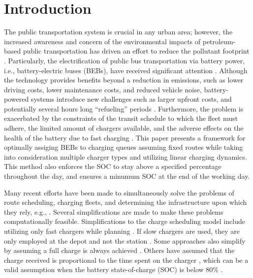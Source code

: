 \documentclass[ee,thesis]{usuthesis}
\begin{document}
\section{Introduction}
\label{sec:milp-introduction}
The public transportation system is crucial in any urban area; however, the increased awareness and concern of the
environmental impacts of petroleum-based public transportation has driven an effort to reduce the pollutant footprint
\cite{de-2014-simul-elect,xylia-2018-role-charg,guida-2017-zeeus-repor-europ,li-2016-batter-elect}. Particularly,
the electrification of public bus transportation via battery power, i.e., battery-electric buses (BEBs), have received
significant attention \cite{li-2016-batter-elect}. Although the technology provides benefits beyond a reduction in
emissions, such as lower driving costs, lower maintenance costs, and reduced vehicle noise, battery-powered systems
introduce new challenges such as larger upfront costs, and potentially several hours long ``refueling'' periods
\cite{xylia-2018-role-charg,li-2016-batter-elect}. Furthermore, the problem is exacerbated by the constraints of the
transit schedule to which the fleet must adhere, the limited amount of chargers available, and the adverse effects on
the health of the battery due to fast charging \cite{lutsey-2019-updat-elect}. This paper presents a
framework for optimally assiging BEBs to charging queues assuming fixed routes while taking into consideration multiple
charger types and utilizing linear charging dynamics. This method also enforces the SOC to stay above a specified
percentage throughout the day, and ensures a minumum SOC at the end of the working day.

Many recent efforts have been made to simultaneously solve the problems of route scheduling, charging fleets, and
determining the infrastructure upon which they rely, e.g., \cite{wei-2018-optim-spatio,sebastiani-2016-evaluat-elect,hoke-2014-accoun-lithium,wang-2017-elect-vehic}. Several simplifications are made to make these problems
computationally feasible. Simplifications to the charge scheduling model include utilizing only fast chargers while
planning \cite{wei-2018-optim-spatio,sebastiani-2016-evaluat-elect,wang-2017-optim-rechar,zhou-2020-bi-objec,yang-2018-charg-sched,wang-2017-elect-vehic,qin-2016-numer-analy,liu-2020-batter-elect}. If slow chargers are used,
they are only employed at the depot and not the station \cite{he-2020-optim-charg,tang-2019-robus-sched}. Some
approaches also simplify by assuming a full charge is always achieved
\cite{wei-2018-optim-spatio,wang-2017-elect-vehic,zhou-2020-bi-objec,wang-2017-optim-rechar}. Others have assumed
that the charge received is proportional to the time spent on the charger
\cite{liu-2020-batter-elect,yang-2018-charg-sched}, which can be a valid assumption when the battery state-of-charge
(SOC) is below 80\% \cite{liu-2020-batter-elect}.
\end{document}
